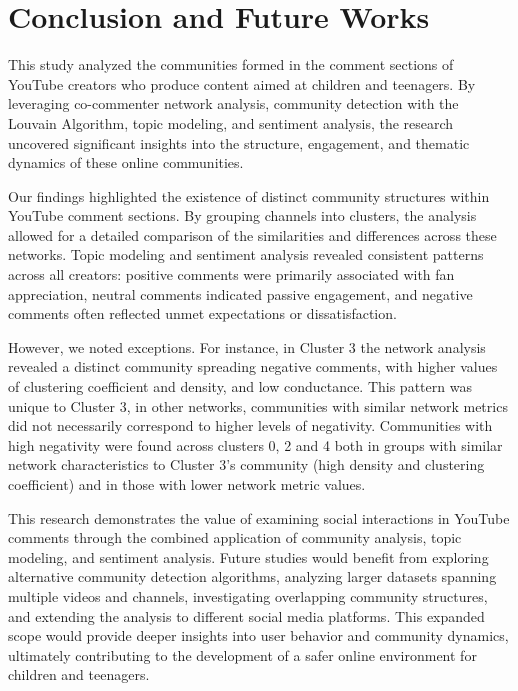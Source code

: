 \documentclass[12pt]{article}
\begin{document}
\section{Conclusion and Future Works}

This study analyzed the communities formed in the comment sections of YouTube creators who produce 
content aimed at children and teenagers. By leveraging co-commenter network analysis, community detection 
with the Louvain Algorithm, topic modeling, and sentiment analysis, the research uncovered significant 
insights into the structure, engagement, and thematic dynamics of these online communities.

Our findings highlighted the existence of distinct community structures within YouTube comment sections. 
By grouping channels into clusters, the analysis allowed for a detailed comparison of the similarities 
and differences across these networks. Topic modeling and sentiment analysis revealed consistent 
patterns across all creators: positive comments were primarily associated with fan appreciation, 
neutral comments indicated passive engagement, and negative comments often reflected unmet expectations 
or dissatisfaction. 

However, we noted exceptions. For instance, in Cluster 3 the network analysis revealed a distinct 
community spreading negative comments, with higher values of clustering coefficient and density, and low conductance.
This pattern was unique to Cluster 3, in other networks, communities with similar network metrics 
did not necessarily correspond to higher levels of negativity. 
Communities with high negativity were found across clusters 0, 2 and 4 both in groups with similar network 
characteristics to Cluster 3's community (high density and clustering coefficient) and in those with 
lower network metric values. 
    
This research demonstrates the value of examining social interactions in YouTube comments through the 
combined application of community analysis, topic modeling, and sentiment analysis. Future studies would benefit 
from exploring alternative community detection algorithms, analyzing larger datasets spanning 
multiple videos and channels, investigating overlapping community structures, and extending the analysis to 
different social media platforms. This expanded scope would provide deeper insights into 
user behavior and community dynamics, ultimately contributing to the development of a safer online 
environment for children and teenagers.



\end{document}
